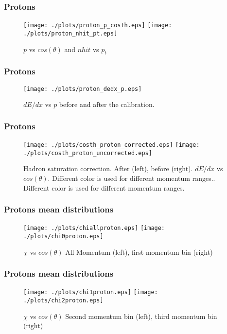\documentclass{beamer}
\begin{document}
\begin{frame}\frametitle{Protons}
\begin{figure}
\texttt{[image: ./plots/proton\_p\_costh.eps]} 
\texttt{[image: ./plots/proton\_nhit\_pt.eps]} 
\caption{$p$ vs $cos(\theta)$ and $nhit$ vs $p_{t}$}
\end{figure}
\end{frame}

\begin{frame}\frametitle{Protons}
\begin{figure}
\texttt{[image: ./plots/proton\_dedx\_p.eps]} 
\caption{$dE/dx$ vs $p$ before and after the calibration.}
\end{figure}
\end{frame}

\begin{frame}\frametitle{Protons}
\begin{figure}
\texttt{[image: ./plots/costh\_proton\_corrected.eps]} 
\texttt{[image: ./plots/costh\_proton\_uncorrected.eps]} 
\caption{Hadron saturation correction. After (left), before (right). $dE/dx$ vs $cos(\theta)$. Different color is used for different momentum ranges.. Different color is used for different momentum ranges.}
\end{figure}
\end{frame}

\begin{frame}\frametitle{Protons mean distributions}
\begin{figure}[!htp]
\centering
\texttt{[image: ./plots/chiallproton.eps]}
\texttt{[image: ./plots/chi0proton.eps]}
\caption{$\chi$ vs $cos(\theta)$ All Momentum (left), first momentum bin (right)}
\end{figure}
\end{frame}

\begin{frame}\frametitle{Protons mean distributions}
\begin{figure}[!htp]
\centering
\texttt{[image: ./plots/chi1proton.eps]}
\texttt{[image: ./plots/chi2proton.eps]}
\caption{$\chi$ vs $cos(\theta)$ Second momentum bin (left), third momentum bin (right)}
\end{figure}
\end{frame}
\end{document}
